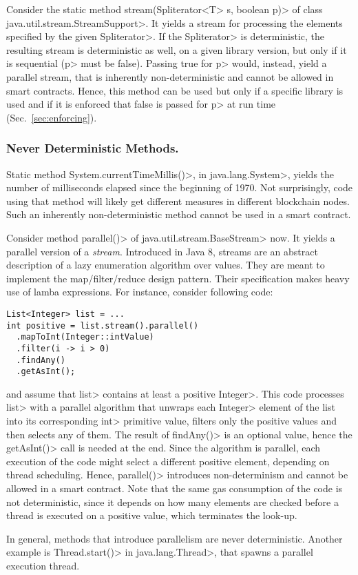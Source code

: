 Consider the static method
\<stream(Spliterator$\text{<}$T$\text{>}$ s, boolean p)>
of class \<java.util.stream.StreamSupport>. It
yields a stream for processing the elements specified by
the given \<Spliterator>. If the \<Spliterator> is deterministic,
the resulting stream is deterministic as well,
on a given library version, but only if it is sequential (\<p> must be false).
Passing true for \<p> would, instead, yield a parallel stream, that is
inherently non-deterministic and cannot be allowed in smart contracts.
Hence, this method can be used but only if a specific library is used and
if it is enforced that false is passed for \<p> at run time (Sec.~\ref{sec:enforcing}).

\subsubsection*{Never Deterministic Methods.}
Static method \<System.currentTimeMillis()>, in \<java.lang.System>,
yields the number of milliseconds elapsed since the beginning of 1970.
Not surprisingly, code using that method will likely get different measures in different
blockchain nodes.
Such an inherently non-deterministic method cannot be used in a smart contract.

Consider method \<parallel()> of \<java.util.stream.BaseStream> now.
It yields a parallel version of a \emph{stream}. Introduced in Java 8, streams are
an abstract description of a lazy enumeration algorithm over values.
They are meant to implement the map/filter/reduce design pattern. Their specification
makes heavy use of lamba expressions. For instance, consider following code:
%
\begin{verbatim}
List<Integer> list = ...
int positive = list.stream().parallel()
  .mapToInt(Integer::intValue)
  .filter(i -> i > 0)
  .findAny()
  .getAsInt();
\end{verbatim}
%
and assume that \<list> contains at least a positive \<Integer>.
This code processes \<list> with a parallel algorithm
that unwraps each \<Integer> element of the list into its corresponding \<int> primitive value,
filters only the positive values and then selects any of them.
The result of \<findAny()> is an optional value, hence the
\<getAsInt()> call is needed at the end. Since the algorithm is
parallel, each execution of the code might select a different
positive element, depending on thread scheduling. Hence, \<parallel()>
introduces non-determinism and
cannot be allowed in a smart contract. Note that the same gas consumption
of the code is not deterministic, since it depends on how many elements
are checked before a thread is executed on a positive value, which terminates
the look-up.

In general, methods that introduce parallelism are never deterministic.
Another example is \<Thread.start()> in \<java.lang.Thread>, that spawns
a parallel execution thread.
